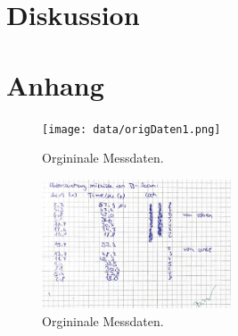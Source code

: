 \section{Diskussion}
\label{sec:Diskussion}

\printbibliography{}

\section*{Anhang}
\label{Anhang}

\begin{figure}[H]
    \centering
    \texttt{[image: data/origDaten1.png]}
    \caption{Orgininale Messdaten.}
    \label{fig:origDaten1}
\end{figure}

\begin{figure}[H]
    \centering
    \includegraphics[width=0.5\textwidth]{data/origDaten2.png}
    \caption{Orgininale Messdaten.}
    \label{fig:origDaten2}
\end{figure}